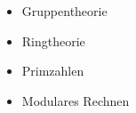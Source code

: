 \begin{module}
\begin{content}
\begin{itemize}\item Gruppentheorie  \item Ringtheorie  \item Primzahlen  \item Modulares Rechnen  \end{itemize}
\end{content}



\end{module}


